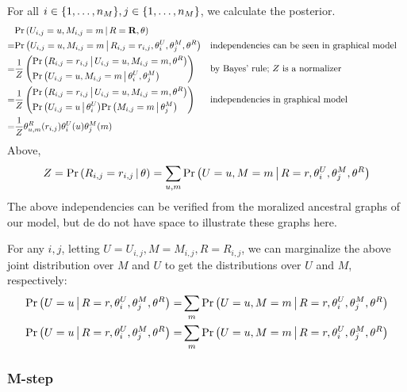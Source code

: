 \documentclass{article}
\begin{document}
For all $i \in {\left\{ 1, \dots, n_M \right\}}, j \in {\left\{ 1, \dots, n_M \right\}}$, we calculate the
posterior.
\begin{align}
& {{\Pr \left(   U_{i,j} = u, M_{i,j} = m  \,\middle|\,  R = {\bf R}, \theta   \right)}} \\
=& {{\Pr \left(   U_{i,j} = u, M_{i,j} = m  \,\middle|\,  R_{i,j} = r_{i,j}, \theta^U_i,
  \theta^M_j, \theta^R   \right)}}
&&
\text{independencies can be seen in graphical model} \\
=& \frac{1}{Z} \left(
\begin{aligned}
& {{\Pr \left(  R_{i,j} = r_{i,j}  \,\middle|\, U_{i,j} = u, M_{i,j} = m, \theta^R  \right)}} \\
& {{\Pr \left(  U_{i,j} = u, M_{i,j} = m \,\middle|\, \theta^U_i, \theta^M_j  \right)}}
\end{aligned} \right)
&& \text{by Bayes' rule; $Z$ is a normalizer} \\
=& \frac{1}{Z} \left(
\begin{aligned}
& {{\Pr \left(  R_{i,j} = r_{i,j}  \,\middle|\, U_{i,j} = u, M_{i,j} = m, \theta^R  \right)}} \\
& {{\Pr \left(  U_{i,j} = u  \,\middle|\, \theta^U_i  \right)}}
  {{\Pr \left(  M_{i,j} = m  \,\middle|\, \theta^M_j  \right)}}
\end{aligned} \right)
&& \text{independencies in graphical model} \\
=& \frac{1}{Z} \theta^R_{u,m}(r_{i,j}) \theta^U_i(u) \theta^M_j(m)
\label{eq:pumrij}
\end{align}
Above,
\begin{align}
  Z = {{\Pr \left(  R_{i,j} = r_{i,j} \,\middle|\, \theta  \right)}} = \sum_{u,m} {{\Pr \left(  U = u, M = m \,\middle|\, R = r, \theta^U_i, \theta^M_j,
    \theta^R  \right)}}
\end{align}
The above independencies can be verified from the moralized ancestral
graphs of our model, but de do not have space to illustrate these
graphs here.

For any $i,j$,
letting $U = U_{i,j}, M = M_{i,j}, R = R_{i,j}$,
we can marginalize the above joint distribution over $M$ and $U$
to get the distributions over $U$ and $M$, respectively:
\begin{align}
  {{\Pr \left(  U = u \,\middle|\, R = r, \theta^U_i, \theta^M_j, \theta^R  \right)}}
  =& \sum_m {{\Pr \left(  U = u, M = m \,\middle|\, R = r, \theta^U_i, \theta^M_j, \theta^R  \right)}}
\\
  {{\Pr \left(  U = u \,\middle|\, R = r, \theta^U_i, \theta^M_j, \theta^R  \right)}}
  =& \sum_m {{\Pr \left(  U = u, M = m \,\middle|\, R = r, \theta^U_i, \theta^M_j, \theta^R  \right)}}
\end{align}

\subsubsection{M-step}
\end{document}
